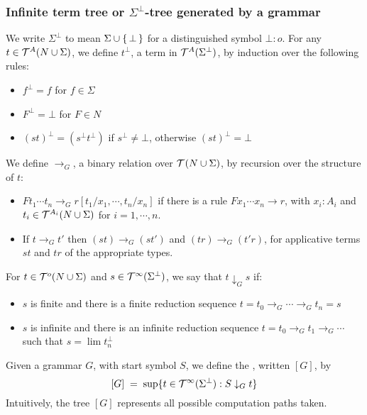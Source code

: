 \subsubsection*{Infinite term tree or $\Sigma^\bot$-tree generated by a
grammar}

We write $\Sigma^\bot$ to mean $\Sigma \cup
\{\,{\bot}\,\}$ for a distinguished symbol $\bot : o$.  For any $t \in
{\cal T}^{A}(N \cup
\Sigma)$, we define $t^\bot$, a term in ${\cal T}^{A}(\Sigma^\bot)$,
by induction over the following rules:
\begin{itemize}
\item $f^\bot = f$ for $f \in \Sigma$
\item $F^\bot = \bot$ for $F \in N$
\item $(st)^\bot = (s^\bot t^\bot)$ if $s^\bot \not = \bot$, otherwise
$(st)^\bot = \bot$
\end{itemize}
We define ${\rightarrow_G}$, a binary relation over ${\cal T}^{}(N \cup
\Sigma)$, by recursion over the structure of $t$:
\begin{itemize}
\item $Ft_1 \cdots t_n \rightarrow_G r[t_1/x_1, \cdots, t_n/x_n]$ if
there is a rule $Fx_1 \cdots x_n \rightarrow r$, with $x_i:A_i$ and
$t_i \in {\cal T}^{A_i}(N \cup \Sigma)$ for $i = 1, \cdots, n$. \item If
$t
\rightarrow_G t'$ then $(st) \rightarrow_G (st')$ and $(tr)
\rightarrow_G (t'r)$, for applicative terms $st$ and $tr$ of the
appropriate types.
\end{itemize}

For $t \in {\cal T}^{o}(N \cup \Sigma)$ and $s \in
{\cal T}^{\infty}(\Sigma^\bot)$, we say that $t \downarrow_G s$ if:
\begin{itemize}
\item $s$ is finite and there is a finite reduction sequence $t = t_0
\rightarrow_G \cdots \rightarrow_G t_n = s$

\item $s$ is infinite and there is an infinite reduction sequence $t =
t_0 \rightarrow_G t_1 \rightarrow_G \cdots$ such that $s = \lim
t^\bot_n$
\end{itemize}

Given a grammar $G$, with start symbol $S$, we define the , written $[G]$, by
\begin{equation}
\nonumber [G] \; = \; \sup \{t \in {\cal T}^{\infty}(\Sigma^\bot) :
S \downarrow_G t\}
\end{equation}
Intuitively, the tree $[G]$ represents all possible computation paths
taken.

